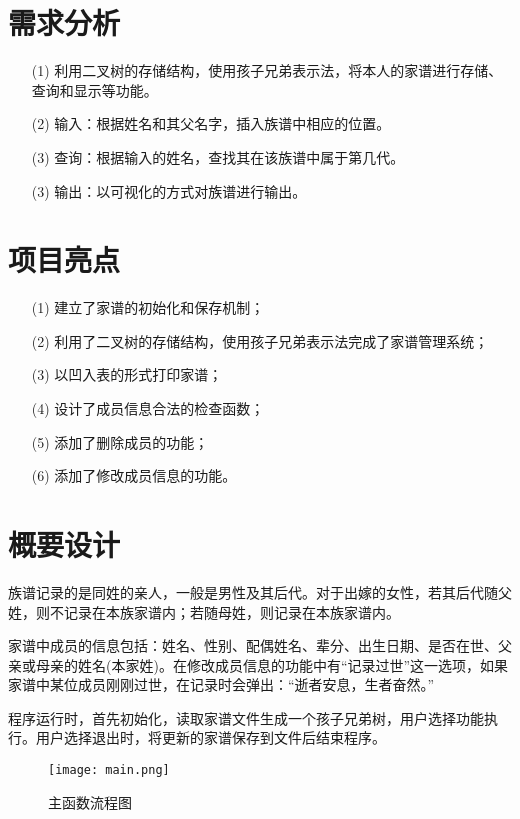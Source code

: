 \documentclass{DateStructure}
\begin{document}
\makecover
\newpage
\thispagestyle{empty}
\tableofcontents   
\newpage
\setcounter{page}{1}  

\section{需求分析}
\begin{itemize}
\item[(1)]利用二叉树的存储结构，使用孩子兄弟表示法，将本人的家谱进行存储、查询和显示等功能。
\item[(2)]输入：根据姓名和其父名字，插入族谱中相应的位置。
\item[(3)]查询：根据输入的姓名，查找其在该族谱中属于第几代。
\item[(3)]输出：以可视化的方式对族谱进行输出。
\end{itemize}

\section{项目亮点}
\begin{itemize}
\item[(1)]建立了家谱的初始化和保存机制；
\item[(2)]利用了二叉树的存储结构，使用孩子兄弟表示法完成了家谱管理系统；
\item[(3)]以凹入表的形式打印家谱；
\item[(4)]设计了成员信息合法的检查函数；
\item[(5)]添加了删除成员的功能；
\item[(6)]添加了修改成员信息的功能。
\end{itemize}

\section{概要设计}
族谱记录的是同姓的亲人，一般是男性及其后代。对于出嫁的女性，若其后代随父姓，则不记录在本族家谱内；若随母姓，则记录在本族家谱内。\par
家谱中成员的信息包括：姓名、性别、配偶姓名、辈分、出生日期、是否在世、父亲或母亲的姓名(本家姓)。在修改成员信息的功能中有“记录过世”这一选项，如果家谱中某位成员刚刚过世，在记录时会弹出：“逝者安息，生者奋然。”\par
程序运行时，首先初始化，读取家谱文件生成一个孩子兄弟树，用户选择功能执行。用户选择退出时，将更新的家谱保存到文件后结束程序。\par
\begin{figure}[H] 
\centering
\texttt{[image: main.png]}
\caption{主函数流程图}
\end{figure}
\end{document}
